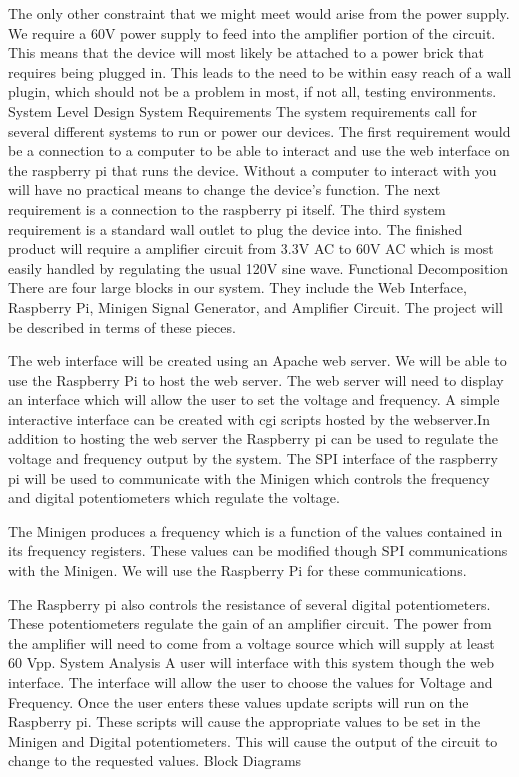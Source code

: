 \documentclass{article}	%
\begin{document}
\begin{multicols}{2}
The only other constraint that we might meet would arise from the power supply. We require a 60V power supply to feed into the amplifier portion of the circuit. This means that the device will most likely be attached to a power brick that requires being plugged in. This leads to the need to be within easy reach of a wall plugin, which should not be a problem in most, if not all, testing environments. 
System Level Design
System Requirements
The system requirements call for several different systems to run or power our devices. The first requirement would be a connection to a computer to be able to interact and use the web interface on the raspberry pi that runs the device. Without a computer to interact with you will have no practical means to change the device's function. The next requirement is a connection to the raspberry pi itself. The third system requirement is a standard wall outlet to plug the device into. The finished product will require a amplifier circuit from 3.3V AC to 60V AC which is most easily handled by regulating the usual 120V sine wave. 
Functional Decomposition
There are four large blocks in our system. They include the Web Interface, Raspberry Pi, Minigen Signal Generator, and Amplifier Circuit. The project will be described in terms of these pieces.

The web interface will be created using an Apache web server. We will be able to use the Raspberry Pi to host the web server. The web server will need to display an interface which will allow the user to set the voltage and frequency. A simple interactive interface can be created with cgi scripts hosted by the webserver.In addition to hosting the web server the Raspberry pi can be used to regulate the voltage and frequency output by the system. The SPI interface of the raspberry pi will be used to communicate with the Minigen which controls the frequency and digital potentiometers which regulate the voltage.

The Minigen produces a frequency which is a function of the values contained in its frequency registers. These values can be modified though SPI communications with the Minigen. We will use the Raspberry Pi for these communications.

The Raspberry pi also controls the resistance of several digital potentiometers. These potentiometers regulate the gain of an amplifier circuit. The power from the amplifier will need to come from a voltage source which will supply at least 60 Vpp.
System Analysis 
A user will interface with this system though the web interface. The interface will allow the user to choose the values for Voltage and Frequency. Once the user enters these values update scripts will run on the Raspberry pi. These scripts will cause the appropriate values to be set in the Minigen and Digital potentiometers. This will cause the output of the circuit to change to the requested values.
Block Diagrams




\end{multicols}
\end{document}
